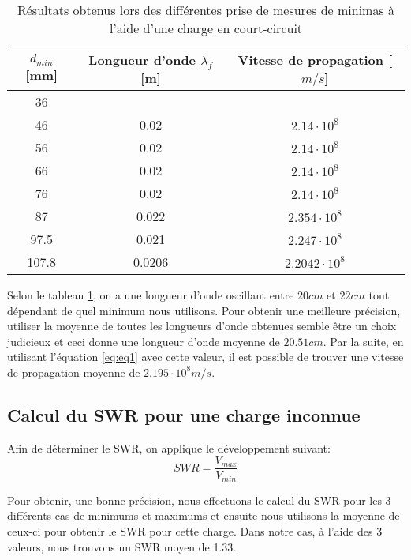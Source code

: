 \begin{table}[htbp]
    \centering
    \begin{tabular}{|c||c|c|} \hline
        $d_{min}$ [mm] & Longueur d'onde $\lambda_f$ [m] & Vitesse de propagation [$m/s$]\\ \hline \hline
        36 &  & \\ 
        46 & 0.02 & $2.14\cdot 10^8$\\ 
        56 & 0.02 & $2.14\cdot 10^8$\\ 
        66 & 0.02 & $2.14\cdot 10^8$\\ 
        76 & 0.02 & $2.14\cdot 10^8$\\ 
        87 & 0.022 & $2.354\cdot 10^8$\\ 
        97.5 & 0.021 & $2.247\cdot 10^8$\\ 
        107.8 & 0.0206 & $2.2042\cdot 10^8$\\ \hline
    \end{tabular}%
        \caption{Résultats obtenus lors des différentes prise de mesures de minimas à l'aide d'une charge en court-circuit}
    \label{tab:tabnum2.1}%
\end{table}%
Selon le tableau \ref{tab:tabnum2.1}, on a une longueur d'onde oscillant entre $20cm$ et $22cm$ tout dépendant de quel minimum nous utilisons. Pour obtenir une meilleure précision, utiliser la moyenne de toutes les longueurs d'onde obtenues semble être un choix judicieux et ceci donne une longueur d'onde moyenne de $20.51cm$. Par la suite, en utilisant l'équation \ref{eq:eq1} avec cette valeur, il est possible de trouver une vitesse de propagation moyenne de $2.195 \cdot 10^8 m/s$.

\subsection{Calcul du SWR pour une charge inconnue}
Afin de déterminer le SWR, on applique le développement suivant:
\begin{equation}
\label{eq:3}
SWR = \frac{V_{max}}{V_{min}}
\end{equation}

Pour obtenir, une bonne précision, nous effectuons le calcul du SWR pour les 3 différents cas de minimums et maximums et ensuite nous utilisons la moyenne de ceux-ci pour obtenir le SWR pour cette charge. Dans notre cas, à l'aide des 3 valeurs, nous trouvons un SWR moyen de 1.33.

